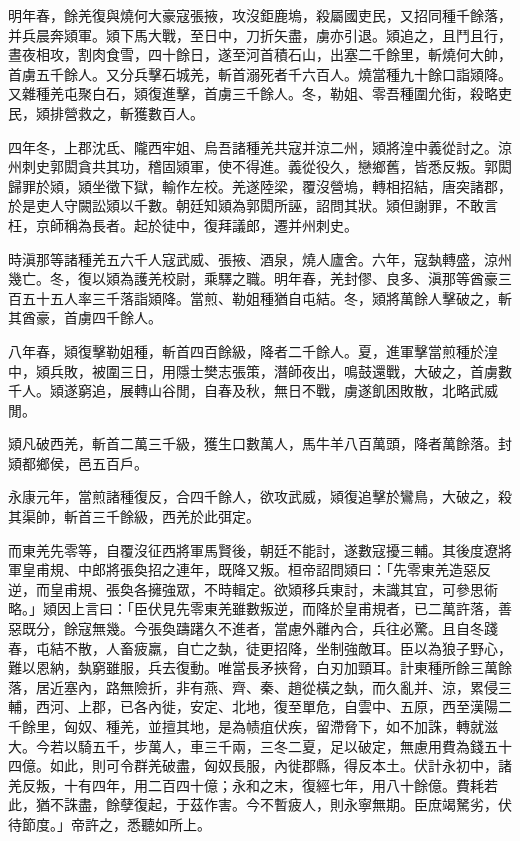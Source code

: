 \begin{pinyinscope}
明年春，餘羌復與燒何大豪寇張掖，攻沒鉅鹿塢，殺屬國吏民，又招同種千餘落，并兵晨奔熲軍。熲下馬大戰，至日中，刀折矢盡，虜亦引退。熲追之，且鬥且行，晝夜相攻，割肉食雪，四十餘日，遂至河首積石山，出塞二千餘里，斬燒何大帥，首虜五千餘人。又分兵擊石城羌，斬首溺死者千六百人。燒當種九十餘口詣熲降。又雜種羌屯聚白石，熲復進擊，首虜三千餘人。冬，勒姐、零吾種圍允街，殺略吏民，熲排營救之，斬獲數百人。

四年冬，上郡沈氐、隴西牢姐、烏吾諸種羌共寇并涼二州，熲將湟中義從討之。涼州刺史郭閎貪共其功，稽固熲軍，使不得進。義從役久，戀鄉舊，皆悉反叛。郭閎歸罪於熲，熲坐徵下獄，輸作左校。羌遂陸梁，覆沒營塢，轉相招結，唐突諸郡，於是吏人守闕訟熲以千數。朝廷知熲為郭閎所誣，詔問其狀。熲但謝罪，不敢言枉，京師稱為長者。起於徒中，復拜議郎，遷并州刺史。

時滇那等諸種羌五六千人寇武威、張掖、酒泉，燒人廬舍。六年，寇埶轉盛，涼州幾亡。冬，復以熲為護羌校尉，乘驛之職。明年春，羌封僇、良多、滇那等酋豪三百五十五人率三千落詣熲降。當煎、勒姐種猶自屯結。冬，熲將萬餘人擊破之，斬其酋豪，首虜四千餘人。

八年春，熲復擊勒姐種，斬首四百餘級，降者二千餘人。夏，進軍擊當煎種於湟中，熲兵敗，被圍三日，用隱士樊志張策，潛師夜出，鳴鼓還戰，大破之，首虜數千人。熲遂窮追，展轉山谷閒，自春及秋，無日不戰，虜遂飢困敗散，北略武威閒。

熲凡破西羌，斬首二萬三千級，獲生口數萬人，馬牛羊八百萬頭，降者萬餘落。封熲都鄉侯，邑五百戶。

永康元年，當煎諸種復反，合四千餘人，欲攻武威，熲復追擊於鸞鳥，大破之，殺其渠帥，斬首三千餘級，西羌於此弭定。

而東羌先零等，自覆沒征西將軍馬賢後，朝廷不能討，遂數寇擾三輔。其後度遼將軍皇甫規、中郎將張奐招之連年，既降又叛。桓帝詔問熲曰：「先零東羌造惡反逆，而皇甫規、張奐各擁強眾，不時輯定。欲熲移兵東討，未識其宜，可參思術略。」熲因上言曰：「臣伏見先零東羌雖數叛逆，而降於皇甫規者，已二萬許落，善惡既分，餘寇無幾。今張奐躊躇久不進者，當慮外離內合，兵往必驚。且自冬踐春，屯結不散，人畜疲羸，自亡之埶，徒更招降，坐制強敵耳。臣以為狼子野心，難以恩納，埶窮雖服，兵去復動。唯當長矛挾脅，白刃加頸耳。計東種所餘三萬餘落，居近塞內，路無險折，非有燕、齊、秦、趙從橫之埶，而久亂并、涼，累侵三輔，西河、上郡，已各內徙，安定、北地，復至單危，自雲中、五原，西至漢陽二千餘里，匈奴、種羌，並擅其地，是為帻疽伏疾，留滯脅下，如不加誅，轉就滋大。今若以騎五千，步萬人，車三千兩，三冬二夏，足以破定，無慮用費為錢五十四億。如此，則可令群羌破盡，匈奴長服，內徙郡縣，得反本土。伏計永初中，諸羌反叛，十有四年，用二百四十億；永和之末，復經七年，用八十餘億。費耗若此，猶不誅盡，餘孽復起，于茲作害。今不暫疲人，則永寧無期。臣庶竭駑劣，伏待節度。」帝許之，悉聽如所上。


\end{pinyinscope}
